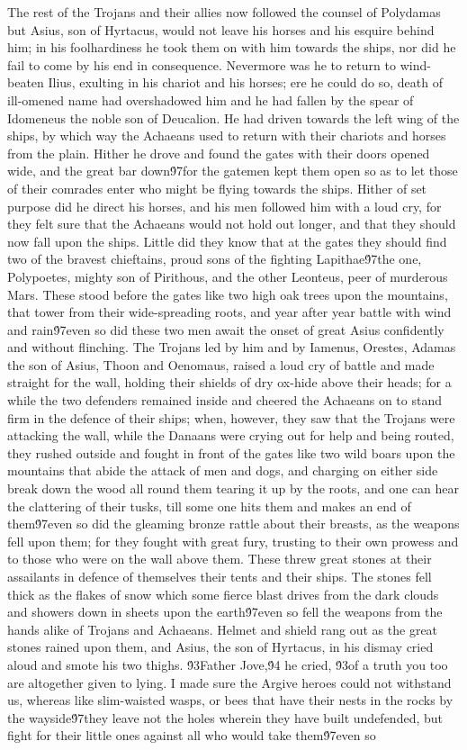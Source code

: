 {The rest of the Trojans and their allies now followed the counsel of Polydamas but Asius, son of Hyrtacus, would not leave his horses and his esquire behind him; in his foolhardiness he took them on with him towards the ships, nor did he fail to come by his end in consequence. Nevermore was he to return to wind-beaten Ilius, exulting in his chariot and his horses; ere he could do so, death of ill-omened name had overshadowed him and he had fallen by the spear of Idomeneus the noble son of Deucalion. He had driven towards the left wing of the ships, by which way the Achaeans used to return with their chariots and horses from the plain. Hither he drove and found the gates with their doors opened wide, and the great bar down\'97for the gatemen kept them open so as to let those of their comrades enter who might be flying towards the ships. Hither of set purpose did he direct his horses, and his men followed him with a loud cry, for they felt sure that the Achaeans would not hold out longer, and that they should now fall upon the ships. Little did they know that at the gates they should find two of the bravest chieftains, proud sons of the fighting Lapithae\'97the one, Polypoetes, mighty son of Pirithous, and the other Leonteus, peer of murderous Mars. These stood before the gates like two high oak trees upon the mountains, that tower from their wide-spreading roots, and year after year battle with wind and rain\'97even so did these two men await the onset of great Asius confidently and without flinching. The Trojans led by him and by Iamenus, Orestes, Adamas the son of Asius, Thoon and Oenomaus, raised a loud cry of battle and made straight for the wall, holding their shields of dry ox-hide above their heads; for a while the two defenders remained inside and cheered the Achaeans on to stand firm in the defence of their ships; when, however, they saw that the Trojans were attacking the wall, while the Danaans were crying out for help and being routed, they rushed outside and fought in front of the gates like two wild boars upon the mountains that abide the attack of men and dogs, and charging on either side break down the wood all round them tearing it up by the roots, and one can hear the clattering of their tusks, till some one hits them and makes an end of them\'97even so did the gleaming bronze rattle about their breasts, as the weapons fell upon them; for they fought with great fury, trusting to their own prowess and to those who were on the wall above them. These threw great stones at their assailants in defence of themselves their tents and their ships. The stones fell thick as the flakes of snow which some fierce blast drives from the dark clouds and showers down in sheets upon the earth\'97even so fell the weapons from the hands alike of Trojans and Achaeans. Helmet and shield rang out as the great stones rained upon them, and Asius, the son of Hyrtacus, in his dismay cried aloud and smote his two thighs. \'93Father Jove,\'94 he cried, \'93of a truth you too are altogether given to lying. I made sure the Argive heroes could not withstand us, whereas like slim-waisted wasps, or bees that have their nests in the rocks by the wayside\'97they leave not the holes wherein they have built undefended, but fight for their little ones against all who would take them\'97even so }
